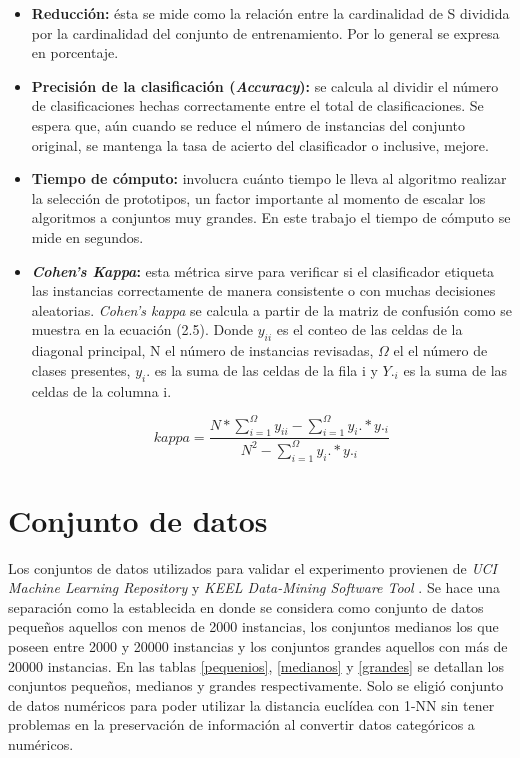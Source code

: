 \begin{itemize}
\item \textbf{Reducción: }
ésta se mide como la relación entre la cardinalidad de S dividida por la cardinalidad del conjunto de entrenamiento. Por lo general se expresa en porcentaje. 


\item \textbf{Precisión de la clasificación (\emph{Accuracy}): }
se calcula al dividir el número de clasificaciones hechas correctamente entre el total de clasificaciones. Se espera que, aún cuando se reduce el número de instancias del conjunto original, se mantenga la tasa de acierto del clasificador o inclusive, mejore.

\item \textbf{Tiempo de cómputo: }
involucra cuánto tiempo le lleva al algoritmo realizar la selección de prototipos, un factor importante al momento de escalar los algoritmos a conjuntos muy grandes. En este trabajo el tiempo de cómputo se mide en segundos.

\item \textbf{\emph{Cohen's Kappa}: } 
esta métrica sirve para verificar si el clasificador etiqueta las instancias correctamente de manera consistente o con muchas decisiones aleatorias. \emph{Cohen's kappa} se calcula a partir de la matriz de confusión como se muestra en la ecuación (2.5). Donde $y_{ii}$ es el conteo de las celdas de la diagonal principal, N el número de instancias revisadas, $\Omega$ el el número de clases presentes, $y_i.$ es la suma de las celdas de la fila i y $Y._i$ es la suma de las celdas de la columna i.

\begin{equation} 
kappa = \frac{N*\sum_{i=1}^{\Omega}y_{ii} - \sum_{i=1}^{\Omega}y_i.*y._i}{N^2 - \sum_{i=1}^{\Omega}y_i.*y._i}
\end{equation}

\end{itemize}


\section{Conjunto de datos}

Los conjuntos de datos utilizados para validar el experimento provienen de \emph{UCI Machine Learning Repository} \cite{Dua:2017} y \emph{KEEL Data-Mining Software Tool} \cite{alcala2011keel}. Se hace una separación como la establecida en \cite{de2004reduccion} donde se considera como conjunto de datos pequeños aquellos con menos de 2000 instancias, los conjuntos medianos los que poseen entre 2000 y 20000 instancias y los conjuntos grandes aquellos con más de 20000 instancias. En las tablas \ref{pequenios}, \ref{medianos} y \ref{grandes} se detallan los conjuntos pequeños, medianos y grandes respectivamente. Solo se eligió conjunto de datos numéricos para poder utilizar la distancia euclídea con 1-NN sin tener problemas en la preservación de información al convertir datos categóricos a numéricos.


